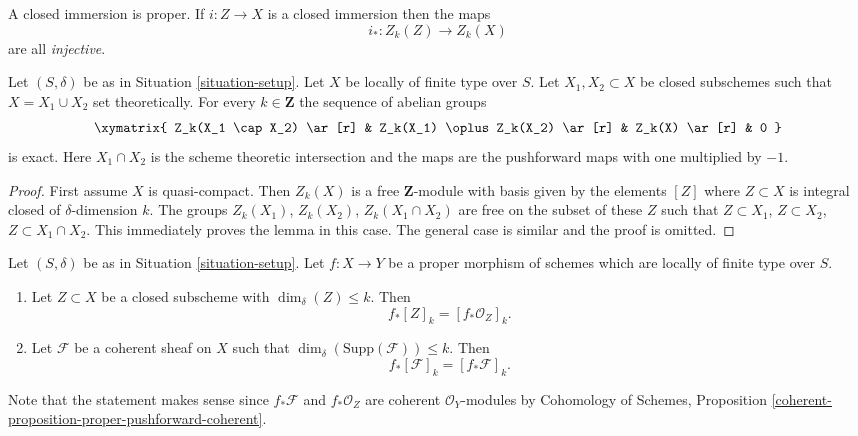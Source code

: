 \noindent
A closed immersion is proper. If $i : Z \to X$ is a closed immersion
then the maps
$$
i_* : Z_k(Z) \longrightarrow Z_k(X)
$$
are all {\it injective}.

\begin{lemma}
\label{lemma-exact-sequence-closed}
Let $(S, \delta)$ be as in Situation \ref{situation-setup}.
Let $X$ be locally of finite type over $S$. Let $X_1, X_2 \subset X$
be closed subschemes such that $X = X_1 \cup X_2$ set theoretically.
For every $k \in \mathbf{Z}$ the sequence of abelian groups
$$
\xymatrix{
Z_k(X_1 \cap X_2) \ar[r] &
Z_k(X_1) \oplus Z_k(X_2) \ar[r] &
Z_k(X) \ar[r] &
0
}
$$
is exact. Here $X_1 \cap X_2$ is the scheme theoretic intersection and
the maps are the pushforward maps with one multiplied by $-1$.
\end{lemma}

\begin{proof}
First assume $X$ is quasi-compact. Then $Z_k(X)$ is a free $\mathbf{Z}$-module
with basis given by the elements $[Z]$ where $Z \subset X$ is integral
closed of $\delta$-dimension $k$. The groups
$Z_k(X_1)$, $Z_k(X_2)$, $Z_k(X_1 \cap X_2)$ are free on the subset of these
$Z$ such that $Z \subset X_1$, $Z \subset X_2$, $Z \subset X_1 \cap X_2$.
This immediately proves the lemma in this case. The general case is similar
and the proof is omitted.
\end{proof}

\begin{lemma}
\label{lemma-cycle-push-sheaf}
Let $(S, \delta)$ be as in Situation \ref{situation-setup}.
Let $f : X \to Y$ be a proper morphism of schemes which are
locally of finite type over $S$.
\begin{enumerate}
\item Let $Z \subset X$ be a closed subscheme with $\dim_\delta(Z) \leq k$.
Then
$$
f_*[Z]_k = [f_*{\mathcal O}_Z]_k.
$$
\item Let $\mathcal{F}$ be a coherent sheaf on $X$ such that
$\dim_\delta(\text{Supp}(\mathcal{F})) \leq k$. Then
$$
f_*[\mathcal{F}]_k = [f_*{\mathcal F}]_k.
$$
\end{enumerate}
Note that the statement makes sense since $f_*\mathcal{F}$ and
$f_*\mathcal{O}_Z$ are coherent $\mathcal{O}_Y$-modules by
Cohomology of Schemes, Proposition
\ref{coherent-proposition-proper-pushforward-coherent}.
\end{lemma}

